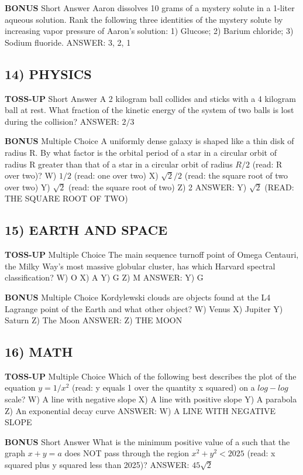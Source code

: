 \documentclass{article}
\begin{document}
\textbf{BONUS}
Short Answer Aaron dissolves 10 grams of a mystery solute in a 1-liter aqueous solution. Rank the following three identities of the mystery solute by increasing vapor pressure of Aaron's solution: 1) Glucose; 2) Barium chloride; 3) Sodium fluoride.
ANSWER: 3, 2, 1

\subsection*{14) PHYSICS}
\textbf{TOSS-UP}
Short Answer A 2 kilogram ball collides and sticks with a 4 kilogram ball at rest. What fraction of the kinetic energy of the system of two balls is lost during the collision?
ANSWER: $2/3$

\textbf{BONUS}
Multiple Choice A uniformly dense galaxy is shaped like a thin disk of radius R. By what factor is the orbital period of a star in a circular orbit of radius R greater than that of a star in a circular orbit of radius $R/2$ (read: R over two)?
W) $1/2$ (read: one over two)
X) $\sqrt{2}/2$ (read: the square root of two over two)
Y) $\sqrt{2}$ (read: the square root of two)
Z) 2
ANSWER: Y) $\sqrt{2}$ (READ: THE SQUARE ROOT OF TWO)

\subsection*{15) EARTH AND SPACE}
\textbf{TOSS-UP}
Multiple Choice The main sequence turnoff point of Omega Centauri, the Milky Way's most massive globular cluster, has which Harvard spectral classification?
W) O
X) A
Y) G
Z) M
ANSWER: Y) G

\textbf{BONUS}
Multiple Choice Kordylewski clouds are objects found at the L4 Lagrange point of the Earth and what other object?
W) Venus
X) Jupiter
Y) Saturn
Z) The Moon
ANSWER: Z) THE MOON

\subsection*{16) MATH}
\textbf{TOSS-UP}
Multiple Choice Which of the following best describes the plot of the equation $y=1/x^{2}$ (read: y equals 1 over the quantity x squared) on a $log-log$ scale?
W) A line with negative slope
X) A line with positive slope
Y) A parabola
Z) An exponential decay curve
ANSWER: W) A LINE WITH NEGATIVE SLOPE

\textbf{BONUS}
Short Answer What is the minimum positive value of a such that the graph $x+y=a$ does NOT pass through the region $x^{2}+y^{2}<2025$ (read: x squared plus y squared less than 2025)?
ANSWER: $45\sqrt{2}$
\end{document}
